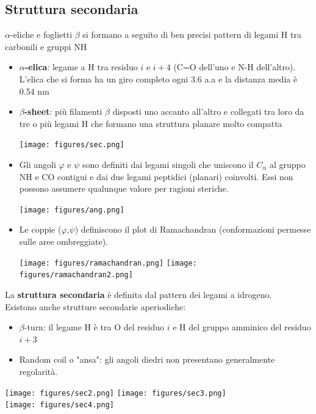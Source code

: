 \documentclass{article}
\begin{document}
\subsection{Struttura secondaria}
$\alpha$-eliche e foglietti $\beta$ si formano a
seguito di ben precisi pattern di
legami H tra carbonili e gruppi NH
\begin{itemize}
    \item \textbf{$\alpha$-elica}: legame a H tra residuo $i$ e
    $i+4$ (C=O dell'uno e N-H dell'altro).
    L'elica che si forma ha un giro
    completo ogni 3.6 a.a e la distanza
    media è 0.54 nm
    \item \textbf{$\beta$-sheet}: più filamenti $\beta$ disposti uno
    accanto all'altro e collegati tra loro
    da tre o più legami H che formano una struttura planare molto compatta
    \begin{center}
        \texttt{[image: figures/sec.png]}
    \end{center}
    \item Gli angoli $\varphi$ e $\psi$ sono definiti dai legami singoli che
    uniscono il $C_{\alpha}$ al gruppo NH e CO contigui e dai due
    legami peptidici (planari) coinvolti. Essi non possono
    assumere qualunque valore per ragioni steriche.
    \begin{center}
        \texttt{[image: figures/ang.png]}
    \end{center}
    \item Le coppie ($\varphi$,$\psi$) definiscono il plot di Ramachandran
    (conformazioni permesse sulle aree ombreggiate).
    \begin{center}
        \texttt{[image: figures/ramachandran.png]}
        \texttt{[image: figures/ramachandran2.png]}
    \end{center}
\end{itemize}

\begin{minipage}[c]{.5\textwidth}
    \raggedright
    La \textbf{struttura secondaria} è definita dal pattern dei legami a
    idrogeno.\\
    Esistono anche strutture secondarie aperiodiche:
    \begin{itemize}
        \item $\beta$-turn: il legame H è tra O del residuo $i$ e H del gruppo amminico del residuo $i+3$ \\
        \item Random coil o "ansa": gli angoli diedri non presentano generalmente regolarità.
\end{itemize}
\end{minipage}%
\begin{minipage}[c]{.5\textwidth}
    \begin{center}
        \texttt{[image: figures/sec2.png]}
        \texttt{[image: figures/sec3.png]}\\
        \texttt{[image: figures/sec4.png]}
    \end{center}
\end{minipage}
\end{document}

